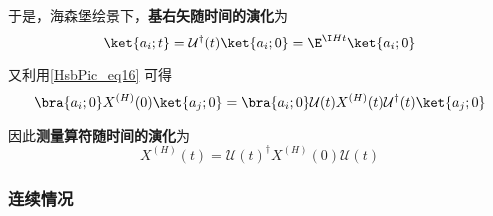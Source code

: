

于是，海森堡绘景下，\textbf{基右矢随时间的演化}为
\begin{equation}\label{HsbPic_eq3}
\ket{a_i; t} = \mathcal{U}^\dagger(t)\ket{a_i; 0} = \E^{\I H t}\ket{a_i; 0}
\end{equation}

又利用\autoref{HsbPic_eq16} 可得
\begin{equation}
\bra{a_i; 0}X^{(H)}(0)\ket{a_j; 0} = \bra{a_i; 0}\mathcal{U}(t)X^{(H)}(t)\mathcal{U}^\dagger(t)\ket{a_j; 0}
\end{equation}

因此\textbf{测量算符随时间的演化}为
\begin{equation}\label{HsbPic_eq2}
X^{(H)}(t) = \mathcal{U}(t)^\dagger X^{(H)}(0) \mathcal{U}(t)
\end{equation}




\subsubsection{连续情况}

